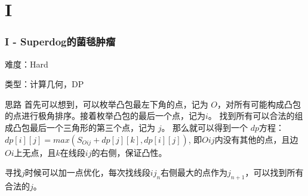 \section{I}
\begin{frame}
\frametitle{I - Superdog的菌毯肿瘤}
难度：Hard

类型：计算几何，DP

\begin{block}{思路}
首先可以想到，可以枚举凸包最左下角的点，记为 $O$，对所有可能构成凸包的点进行极角排序。接着枚举凸包的最后一个点，记为$i$。
找到所有可以合法的组成凸包最后一个三角形的第三个点，记为 $j$。
那么就可以得到一个 $dp$方程：$dp[i][j]=max(S_{Oij}+dp[j][k],dp[i][j])$,
即$Oij$内没有其他的点，且边$Oi$上无点，且$k$在线段$ij$的右侧，保证凸性。

寻找$j$时候可以加一点优化，每次找线段$ij_n$右侧最大的点作为$j_{n+1}$，可以找到所有合法的$j$。
\end{block}
\end{frame}